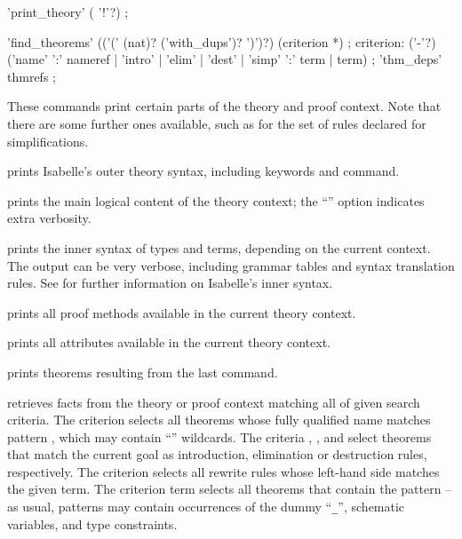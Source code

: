 \begin{isabellebody}
\begin{isamarkuptext}
  \begin{rail}
    'print\_theory' ( '!'?)
    ;

    'find\_theorems' (('(' (nat)? ('with\_dups')? ')')?) (criterion *)
    ;
    criterion: ('-'?) ('name' ':' nameref | 'intro' | 'elim' | 'dest' |
      'simp' ':' term | term)
    ;
    'thm\_deps' thmrefs
    ;
  \end{rail}

  These commands print certain parts of the theory and proof context.
  Note that there are some further ones available, such as for the set
  of rules declared for simplifications.

  \begin{descr}
  
  \item [\isa{\isacommand{print{\isacharunderscore}commands}}] prints Isabelle's outer theory
  syntax, including keywords and command.
  
  \item [\isa{\isacommand{print{\isacharunderscore}theory}}] prints the main logical content of
  the theory context; the ``\isa{{\isacharbang}}'' option indicates extra
  verbosity.

  \item [\isa{\isacommand{print{\isacharunderscore}syntax}}] prints the inner syntax of types
  and terms, depending on the current context.  The output can be very
  verbose, including grammar tables and syntax translation rules.  See
  \cite[\S7, \S8]{isabelle-ref} for further information on Isabelle's
  inner syntax.
  
  \item [\isa{\isacommand{print{\isacharunderscore}methods}}] prints all proof methods
  available in the current theory context.
  
  \item [\isa{\isacommand{print{\isacharunderscore}attributes}}] prints all attributes
  available in the current theory context.
  
  \item [\isa{\isacommand{print{\isacharunderscore}theorems}}] prints theorems resulting from
  the last command.
  
  \item [\isa{\isacommand{find{\isacharunderscore}theorems}}~\isa{criteria}] retrieves facts
  from the theory or proof context matching all of given search
  criteria.  The criterion  selects all theorems
  whose fully qualified name matches pattern , which may
  contain ``\isa{{\isacharasterisk}}'' wildcards.  The criteria ,
  , and  select theorems that match the
  current goal as introduction, elimination or destruction rules,
  respectively.  The criterion  selects all rewrite
  rules whose left-hand side matches the given term.  The criterion
  term  selects all theorems that contain the pattern  -- as usual, patterns may contain occurrences of the dummy
  ``\verb|_|'', schematic variables, and type constraints.
  

\end{descr}
\end{isamarkuptext}
\end{isabellebody}
